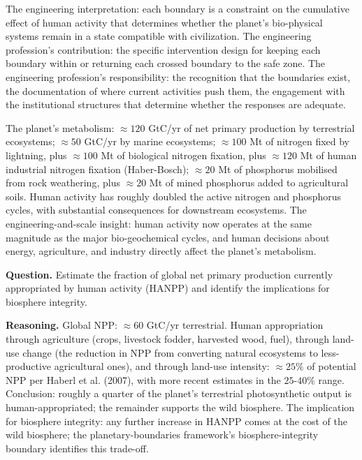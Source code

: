 The engineering interpretation: each boundary is a constraint on the cumulative effect of human activity that determines whether the planet's bio-physical systems remain in a state compatible with civilization. The engineering profession's contribution: the specific intervention design for keeping each boundary within or returning each crossed boundary to the safe zone. The engineering profession's responsibility: the recognition that the boundaries exist, the documentation of where current activities push them, the engagement with the institutional structures that determine whether the responses are adequate.

\begin{archetype}
The planet's metabolism: $\approx 120$ GtC/yr of net primary production by terrestrial ecosystems; $\approx 50$ GtC/yr by marine ecosystems; $\approx 100$ Mt of nitrogen fixed by lightning, plus $\approx 100$ Mt of biological nitrogen fixation, plus $\approx 120$ Mt of human industrial nitrogen fixation (Haber-Bosch); $\approx 20$ Mt of phosphorus mobilised from rock weathering, plus $\approx 20$ Mt of mined phosphorus added to agricultural soils. Human activity has roughly doubled the active nitrogen and phosphorus cycles, with substantial consequences for downstream ecosystems. The engineering-and-scale insight: human activity now operates at the same magnitude as the major bio-geochemical cycles, and human decisions about energy, agriculture, and industry directly affect the planet's metabolism.
\end{archetype}

\begin{estimation}
\textbf{Question.} Estimate the fraction of global net primary production currently appropriated by human activity (HANPP) and identify the implications for biosphere integrity.

\textbf{Reasoning.} Global NPP: $\approx 60$ GtC/yr terrestrial. Human appropriation through agriculture (crops, livestock fodder, harvested wood, fuel), through land-use change (the reduction in NPP from converting natural ecosystems to less-productive agricultural ones), and through land-use intensity: $\approx 25\%$ of potential NPP per Haberl et al. (2007), with more recent estimates in the $25$-$40\%$ range. Conclusion: roughly a quarter of the planet's terrestrial photosynthetic output is human-appropriated; the remainder supports the wild biosphere. The implication for biosphere integrity: any further increase in HANPP comes at the cost of the wild biosphere; the planetary-boundaries framework's biosphere-integrity boundary identifies this trade-off.
\end{estimation}

